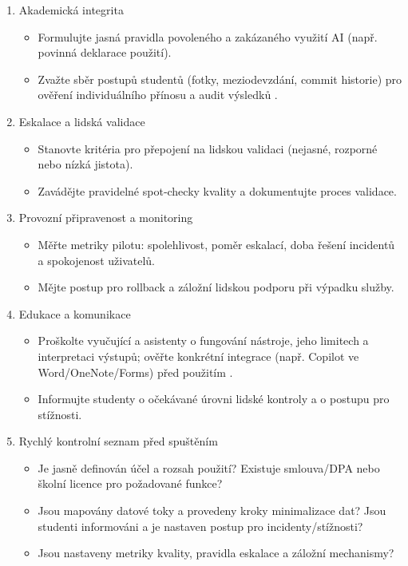 \documentclass{report}%
\begin{document}
\begin{enumerate}
  \item Akademická integrita
    \begin{itemize}
      \item Formulujte jasná pravidla povoleného a zakázaného využití AI (např. povinná deklarace použití).
      \item Zvažte sběr postupů studentů (fotky, meziodevzdání, commit historie) pro ověření individuálního přínosu a audit výsledků \cite{kb_ai_101_tipu_pdf_04e4a115_page_8_1}.
    \end{itemize}

  \item Eskalace a lidská validace
    \begin{itemize}
      \item Stanovte kritéria pro přepojení na lidskou validaci (nejasné, rozporné nebo nízká jistota).
      \item Zavádějte pravidelné spot‑checky kvality a dokumentujte proces validace.
    \end{itemize}

  \item Provozní připravenost a monitoring
    \begin{itemize}
      \item Měřte metriky pilotu: spolehlivost, poměr eskalací, doba řešení incidentů a spokojenost uživatelů.
      \item Mějte postup pro rollback a záložní lidskou podporu při výpadku služby.
    \end{itemize}

  \item Edukace a komunikace
    \begin{itemize}
      \item Proškolte vyučující a asistenty o fungování nástroje, jeho limitech a interpretaci výstupů; ověřte konkrétní integrace (např. Copilot ve Word/OneNote/Forms) před použitím \cite{kb_ai_101_tipu_pdf_04e4a115_page_8_1}.
      \item Informujte studenty o očekávané úrovni lidské kontroly a o postupu pro stížnosti.
    \end{itemize}

  \item Rychlý kontrolní seznam před spuštěním
    \begin{itemize}
      \item Je jasně definován účel a rozsah použití? Existuje smlouva/DPA nebo školní licence pro požadované funkce?
      \item Jsou mapovány datové toky a provedeny kroky minimalizace dat? Jsou studenti informováni a je nastaven postup pro incidenty/stížnosti?
      \item Jsou nastaveny metriky kvality, pravidla eskalace a záložní mechanismy?
    \end{itemize}
\end{enumerate}
\end{document}
